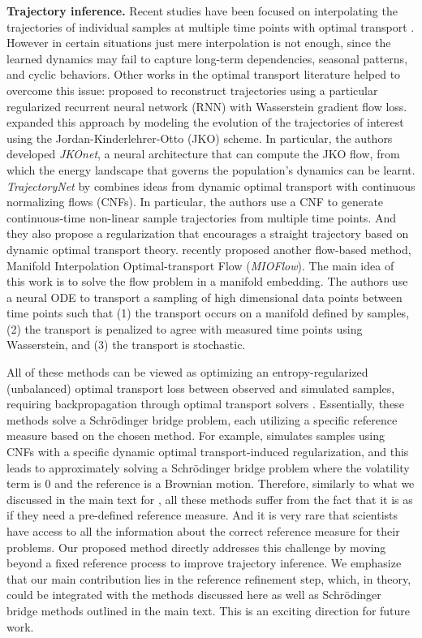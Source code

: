\textbf{Trajectory inference.} Recent studies have been focused on interpolating the trajectories of individual samples at multiple time points with optimal  transport \citep{schiebinger2019optimal, yang2018scalable}. However in certain situations just mere interpolation is not enough, since the learned dynamics may fail to capture long-term dependencies, seasonal patterns, and cyclic behaviors. Other works in the optimal transport literature helped to overcome this issue: \citet{hashimoto2016learning} proposed to reconstruct trajectories using a particular regularized recurrent neural network (RNN) with Wasserstein gradient flow loss. \citet{bunne2022proximal} expanded this approach by modeling the evolution of the trajectories of interest using the Jordan-Kinderlehrer-Otto (JKO) scheme. In particular, the authors developed \textit{JKOnet}, a neural architecture that can compute the JKO flow, from which the energy landscape that governs the population's dynamics can be learnt. \textit{TrajectoryNet} by \citet{tong2020trajectorynet} combines ideas from dynamic optimal transport with continuous normalizing flows (CNFs). In particular, the authors use a CNF to generate continuous-time non-linear sample trajectories from multiple time points. And they also propose a regularization that encourages a straight trajectory based on dynamic optimal transport theory. \citet{huguet2022manifold} recently proposed another flow-based method,
Manifold Interpolation Optimal-transport Flow (\textit{MIOFlow}). The main idea of this work is to solve the flow problem in a manifold embedding. The authors use a neural ODE \citep{chen2018neural} to transport a sampling of high dimensional data points between time points such that (1) the transport occurs on a manifold defined by samples, (2) the transport is penalized
to agree with measured time points using Wasserstein, and (3) the transport is stochastic.

All of these methods can be viewed as optimizing an entropy-regularized (unbalanced) optimal transport loss between observed and simulated samples, requiring backpropagation through optimal transport solvers \citep{cuturi2013sinkhorn, cuturi2022optimal}. Essentially, these methods solve a Schrödinger bridge problem, each utilizing a specific reference measure based on the chosen method. For example, \citet{tong2020trajectorynet} simulates samples using CNFs with a specific dynamic optimal transport-induced regularization, and this leads to approximately solving a Schrödinger bridge problem where the volatility term is 0 and the reference is a Brownian motion. Therefore, similarly to what we discussed in the main text for \citet{chen2024deep}, all these methods suffer from the fact that it is as if they need a pre-defined reference measure. And it is very rare that scientists have access to all the information about the correct reference measure for their problems. Our proposed method directly addresses this challenge by moving beyond a fixed reference process to improve trajectory inference. We emphasize that our main contribution lies in the reference refinement step, which, in theory, could be integrated with the methods discussed here as well as Schrödinger bridge methods outlined in the main text. This is an exciting direction for future work.


